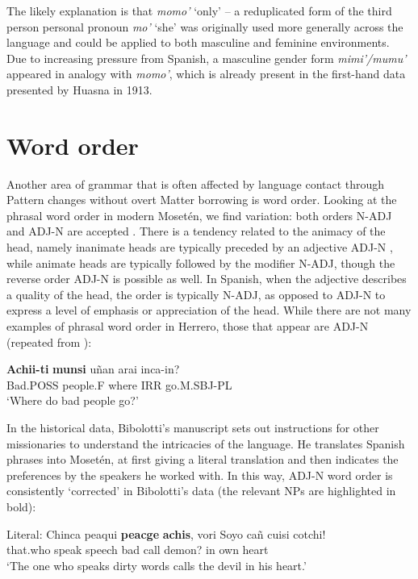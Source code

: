 \documentclass[output=paper,colorlinks,citecolor=brown
]{langscibook}
\begin{document}
The likely explanation is that \textit{momo’} ‘only’ – a reduplicated form of the third person personal pronoun \textit{mo’} ‘she’ was originally used more generally across the language and could be applied to both masculine and feminine environments. Due to increasing pressure from Spanish, a masculine gender form \textit{mimi’/mumu’} appeared in analogy with \textit{momo’}, which is already present in the first-hand data presented by Huasna in 1913.

\section{Word order}
Another area of grammar that is often affected by language contact through Pattern changes without overt Matter borrowing is word order. Looking at the phrasal word order in modern Mosetén, we find variation: both orders N-ADJ and ADJ-N are accepted \cite[p.~103]{sakel2004grammar}. There is a tendency related to the animacy of the head, namely inanimate heads are typically preceded by an adjective ADJ-N , while animate heads are typically followed by the modifier N-ADJ, though the reverse order ADJ-N is possible as well. In Spanish, when the adjective describes a quality of the head, the order is typically N-ADJ, as opposed to ADJ-N to express a level of emphasis or appreciation of the head.
While there are not many examples of phrasal word order in Herrero, those that appear are ADJ-N (repeated from ):

\ea \label{sakel_example_14}
\gll \textbf{Achii-ti} 	\textbf{munsi} 		uñan 	arai  	inca-in?\\
     Bad.\textsc{POSS}	people.\textsc{F}	where	\textsc{IRR} 	go.\textsc{M.SBJ-PL}\\
\glt ‘Where do bad people go?’
\z	

In the historical data, Bibolotti’s manuscript sets out instructions for other missionaries to understand the intricacies of the language. He translates Spanish phrases into Mosetén, at first giving a literal translation and then indicates the preferences by the speakers he worked with. In this way, ADJ-N word order is consistently ‘corrected’ in Bibolotti’s data (the relevant NPs are highlighted in bold): 

Literal:
\ea \label{sakel_example_15}
\gll Chinca  peaqui  \textbf{peacge}  \textbf{achis},  vori    Soyo    cañ cuisi   cotchi!\\
     that.who   speak    speech  bad	call   demon?    in  own heart\\
\glt ‘The one who speaks dirty words calls the devil in his heart.’
\z	
\end{document}
